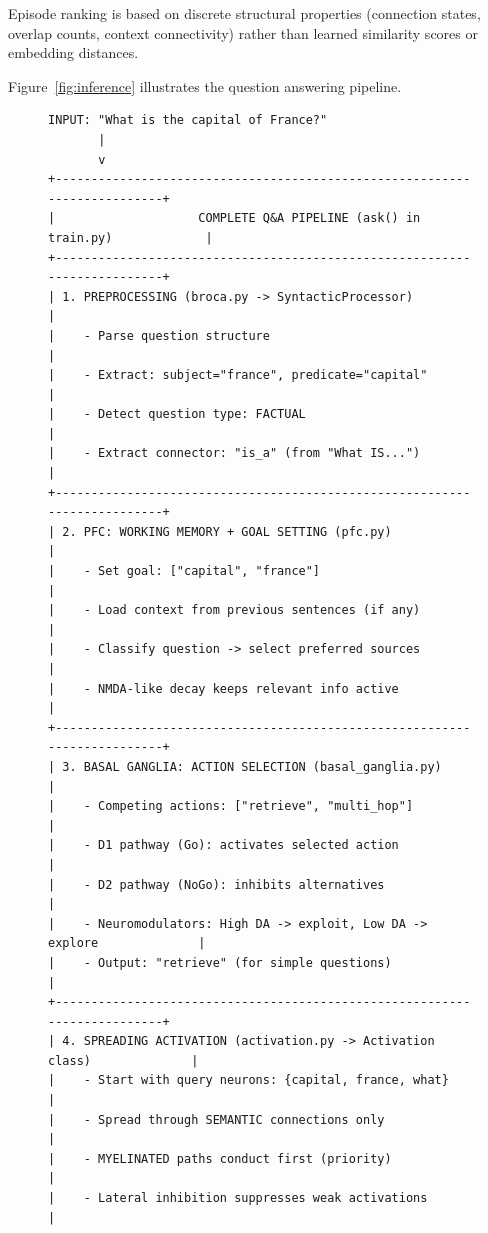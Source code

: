 \documentclass[11pt]{article}
\begin{document}
Episode ranking is based on discrete structural properties (connection states,
overlap counts, context connectivity) rather than learned similarity scores or
embedding distances.

Figure~\ref{fig:inference} illustrates the question answering pipeline.

\begin{figure}[ht]
\centering
\begin{Verbatim}[fontsize=\tiny,frame=single]
INPUT: "What is the capital of France?"
       |
       v
+--------------------------------------------------------------------------+
|                    COMPLETE Q&A PIPELINE (ask() in train.py)             |
+--------------------------------------------------------------------------+
| 1. PREPROCESSING (broca.py -> SyntacticProcessor)                        |
|    - Parse question structure                                            |
|    - Extract: subject="france", predicate="capital"                      |
|    - Detect question type: FACTUAL                                       |
|    - Extract connector: "is_a" (from "What IS...")                       |
+--------------------------------------------------------------------------+
| 2. PFC: WORKING MEMORY + GOAL SETTING (pfc.py)                           |
|    - Set goal: ["capital", "france"]                                     |
|    - Load context from previous sentences (if any)                       |
|    - Classify question -> select preferred sources                       |
|    - NMDA-like decay keeps relevant info active                          |
+--------------------------------------------------------------------------+
| 3. BASAL GANGLIA: ACTION SELECTION (basal_ganglia.py)                    |
|    - Competing actions: ["retrieve", "multi_hop"]                        |
|    - D1 pathway (Go): activates selected action                          |
|    - D2 pathway (NoGo): inhibits alternatives                            |
|    - Neuromodulators: High DA -> exploit, Low DA -> explore              |
|    - Output: "retrieve" (for simple questions)                           |
+--------------------------------------------------------------------------+
| 4. SPREADING ACTIVATION (activation.py -> Activation class)              |
|    - Start with query neurons: {capital, france, what}                   |
|    - Spread through SEMANTIC connections only                            |
|    - MYELINATED paths conduct first (priority)                           |
|    - Lateral inhibition suppresses weak activations                      |

\end{Verbatim}
\end{figure}
\end{document}
